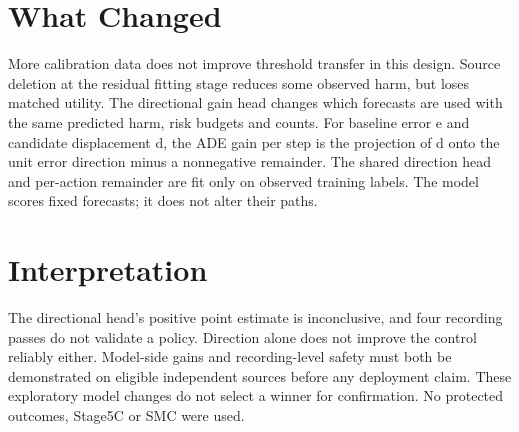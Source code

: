 \documentclass[10pt,onecolumn,letterpaper]{article}
\begin{document}
\section{What Changed}

More calibration data does not improve threshold transfer in this design. Source deletion at the residual fitting stage reduces some observed harm, but loses matched utility. The directional gain head changes which forecasts are used with the same predicted harm, risk budgets and counts. For baseline error e and candidate displacement d, the ADE gain per step is the projection of d onto the unit error direction minus a nonnegative remainder. The shared direction head and per-action remainder are fit only on observed training labels. The model scores fixed forecasts; it does not alter their paths.


\section{Interpretation}

The directional head's positive point estimate is inconclusive, and four recording passes do not validate a policy. Direction alone does not improve the control reliably either. Model-side gains and recording-level safety must both be demonstrated on eligible independent sources before any deployment claim. These exploratory model changes do not select a winner for confirmation. No protected outcomes, Stage5C or SMC were used.
\end{document}
